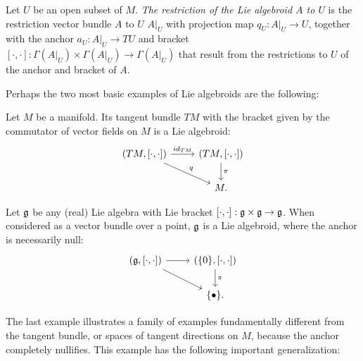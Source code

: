 \begin{definition}%
Let $U$ be an open subset of $M$. \emph{The restriction of the Lie algebroid $A$ to $U$} is the restriction vector bundle $A$ to $U$ $A|_U$ with projection map $q_U: A|_U \to U$, together with the anchor $a_U:A|_U \to TU$ and bracket $[\cdot , \cdot]:\Gamma(A|_U)\times \Gamma(A|_U) \to \Gamma(A|_U)$ that result from the restrictions to $U$ of the anchor and bracket of $A$.
\end{definition}



Perhaps the two most basic examples of Lie algebroids are the following:
\begin{example} \label{exampleTMIsAlgebroid}
Let $M$ be a manifold. Its tangent bundle $TM$ with the bracket given by the commutator of vector fields on $M$ is a Lie algebroid:
\begin{equation*}
    \begin{tikzcd}
    (TM, [\cdot, \cdot]) \arrow{r}{id_{TM}} \arrow{dr}{q} & (TM, [\cdot, \cdot]) \arrow{d}{\pi}\\
    & M.
    \end{tikzcd}
\end{equation*}
\end{example}

\begin{example}\label{exampleLieAlgebraIsAlgebroid}
Let $\mathfrak{g}$ be any (real) Lie algebra with Lie bracket $[\cdot, \cdot]: \mathfrak{g} \times \mathfrak{g} \to \mathfrak{g}$. When considered as a vector bundle over a point, $\mathfrak{g}$ is a Lie algebroid, where the anchor is necessarily null:
\begin{equation*}
    \begin{tikzcd}
    (\alg g, [\cdot, \cdot]) \arrow{r} \arrow{dr} & (\{0\}, [\cdot, \cdot]) \arrow{d}{\pi}\\
    & \{\bullet\}.
    \end{tikzcd}
\end{equation*}
\end{example}

The last example illustrates a family of examples fundamentally different from the tangent bundle, or spaces of tangent directions on $M$, because the anchor completely nullifies. This example has the following important generalization:

